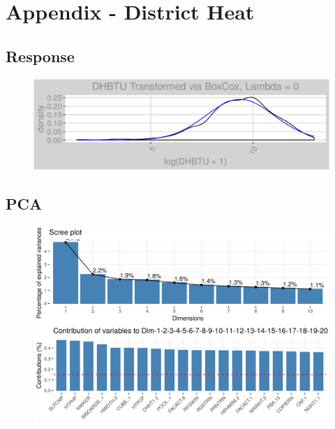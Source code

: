 \section*{Appendix - District Heat}
\label{sec:appendix_dh}
\appendix
\subsection{Response}
\label{appendix:district_heat:response}
\begin{figure}[h]
\centering
\includegraphics[width=\textwidth, height=0.3\textheight]{Images/district_heat_response.png}
\end{figure}
\subsection{PCA}
\label{appendix:district_heat:pca}
\begin{figure}[h]
\centering
\includegraphics[width=\textwidth, height=0.3\textheight]{Images/district_heat_pca_vars.png}
\end{figure}
\FloatBarrier
\newpage
